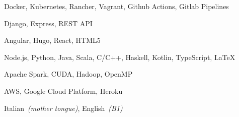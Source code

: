 

\begin{cvskills}

    {Docker, Kubernetes, Rancher, Vagrant, Github Actions, Gitlab Pipelines} %

    {Django, Express, REST API} %

    {Angular, Hugo, React, HTML5} %

    {Node.js, Python, Java, Scala, C/C++, Haskell, Kotlin, TypeScript, LaTeX} %

    {Apache Spark, CUDA, Hadoop, OpenMP}

    {AWS, Google Cloud Platform, Heroku}

    {Italian~\textit{(mother tongue)}, English~\textit{(B1)}} %

\end{cvskills}